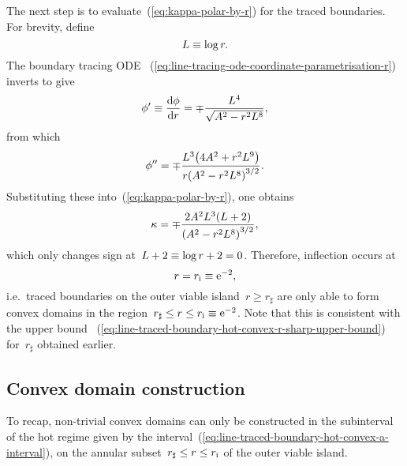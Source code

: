 The next step is to evaluate~(\ref{eq:kappa-polar-by-r})
for the traced boundaries.
For brevity, define
\begin{equation}
  L \defeq \log r.
  \label{eq:line-abbreviation-l}
\end{equation}
The boundary tracing ODE~%
  (\ref{eq:line-tracing-ode-coordinate-parametrisation-r})
inverts to give
\begin{equation}
  \phi' \defeq \tder{\phi}{r} = \mp \frac{L^4}{\sqrt{A^2 - r^2 L^8}},
  \label{eq:line-traced-boundary-phi-r-derivative}
\end{equation}
from which
\begin{equation}
  \phi'' =
  \mp \frac{L^3 \roundbr*{4 A^2 + r^2 L^9}}{r \roundbr*{A^2 - r^2 L^8}^{3/2}}.
  \label{eq:line-traced-boundary-phi-r-second-derivative}
\end{equation}
Substituting these into~(\ref{eq:kappa-polar-by-r}),
one obtains
\begin{equation}
  \kappa =
  \mp \frac{2 A^2 L^3 (L + 2)}{\roundbr*{A^2 - r^2 L^8}^{3/2}},
  \label{eq:line-traced-boundary-kappa-polar-by-r}
\end{equation}
which only changes sign at~$L + 2 \equiv \log r + 2 = 0$.
Therefore, inflection occurs at
\begin{equation}
  r = r_\infl \defeq \ee^{-2},
  \label{eq:line-r-inflection}
\end{equation}
i.e.~traced boundaries on the outer viable island~$r \ge r_\sharp$
are only able to form convex domains
in the region~$r_\sharp \le r \le r_{\mathrm{i}} \equiv \mathrm{e}^{-2}$.
Note that this is consistent with the upper bound~%
  (\ref{eq:line-traced-boundary-hot-convex-r-sharp-upper-bound})
for~$r_\sharp$ obtained earlier.

\subsection{Convex domain construction}
\label{sec:line.convex.construction}

To recap, non-trivial convex domains can only be constructed
in the subinterval of the hot regime
given by the interval~(\ref{eq:line-traced-boundary-hot-convex-a-interval}),
on the annular subset~$r_\sharp \le r \le r_{\mathrm{i}}$
of the outer viable island.

